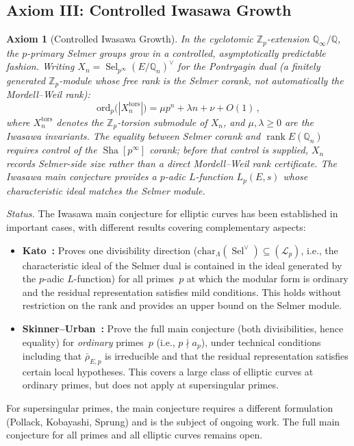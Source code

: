 \documentclass[aps,prd,twocolumn,superscriptaddress,nofootinbib,floatfix]{revtex4-2}
\newtheorem{axiom}[theorem]{Axiom}
\theoremstyle{definition}
\theoremstyle{remark}
\DeclareMathOperator{\rank}{rank}
\DeclareMathOperator{\Sel}{Sel}
\DeclareMathOperator{\Sha}{Sha}
\begin{document}
\subsection{Axiom III: Controlled Iwasawa Growth}

\begin{axiom}[Controlled Iwasawa Growth]
\label{ax:iwasawa}
In the cyclotomic $\mathbb{Z}_p$-extension $\mathbb{Q}_\infty/\mathbb{Q}$, the $p$-primary Selmer groups grow in a controlled, asymptotically predictable fashion. Writing $X_n = \Sel_{p^\infty}(E/\mathbb{Q}_n)^\vee$ for the Pontryagin dual (a finitely generated $\mathbb{Z}_p$-module whose free rank is the Selmer corank, not automatically the Mordell--Weil rank):
\begin{equation}
\mathrm{ord}_p\!\bigl(|X_n^{\mathrm{tors}}|\bigr) = \mu p^n + \lambda n + \nu + O(1)\,,
\label{eq:iwasawa_growth}
\end{equation}
where $X_n^{\mathrm{tors}}$ denotes the $\mathbb{Z}_p$-torsion submodule of $X_n$, and $\mu, \lambda \geq 0$ are the Iwasawa invariants. The equality between Selmer corank and $\rank E(\mathbb{Q}_n)$ requires control of the $\Sha[p^\infty]$ corank; before that control is supplied, $X_n$ records Selmer-side size rather than a direct Mordell--Weil rank certificate. The Iwasawa main conjecture provides a $p$-adic $L$-function $L_p(E,s)$ whose characteristic ideal matches the Selmer module.
\end{axiom}

\textit{Status.} The Iwasawa main conjecture for elliptic curves has been established in important cases, with different results covering complementary aspects:
\begin{itemize}
\item \textbf{Kato~\cite{Kato2004}:} Proves one divisibility direction ($\mathrm{char}_\Lambda(\Sel^\vee) \subseteq (\mathcal{L}_p)$, i.e., the characteristic ideal of the Selmer dual is contained in the ideal generated by the $p$-adic $L$-function) for all primes~$p$ at which the modular form is ordinary and the residual representation satisfies mild conditions. This holds without restriction on the rank and provides an upper bound on the Selmer module.
\item \textbf{Skinner--Urban~\cite{SkinnerUrban2014}:} Prove the full main conjecture (both divisibilities, hence equality) for \textit{ordinary} primes~$p$ (i.e., $p \nmid a_p$), under technical conditions including that $\bar{\rho}_{E,p}$ is irreducible and that the residual representation satisfies certain local hypotheses. This covers a large class of elliptic curves at ordinary primes, but does not apply at supersingular primes.
\end{itemize}
For supersingular primes, the main conjecture requires a different formulation (Pollack, Kobayashi, Sprung) and is the subject of ongoing work. The full main conjecture for all primes and all elliptic curves remains open.
\end{document}
